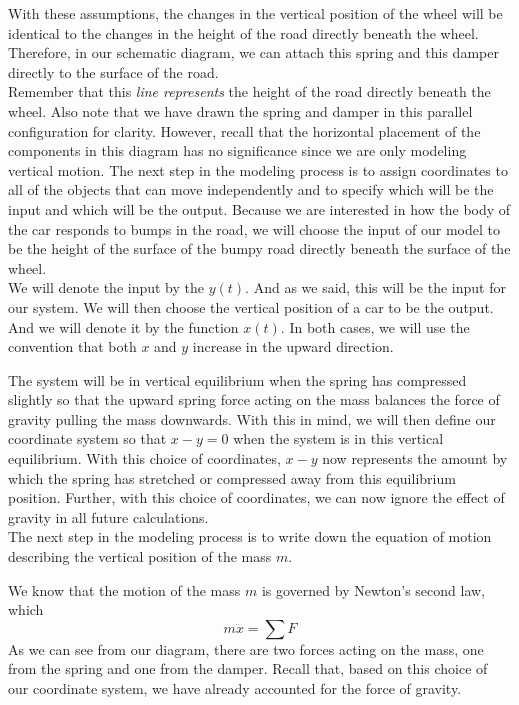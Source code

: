 With these assumptions, the changes in the vertical position of the wheel
will be identical to the changes in the height of the road directly beneath the wheel.
Therefore, in our schematic diagram, we can attach this spring and this damper
directly to the surface of the road.\\

Remember that this \emph{line represents} the height of the road directly beneath the wheel.
Also note that we have drawn the spring and damper
in this parallel configuration for clarity.
However, recall that the horizontal placement of the components in this diagram
has no significance since we are only modeling vertical motion.
The next step in the modeling process is to assign coordinates to all of the objects that
can move independently and to specify which will be the input
and which will be the output.
Because we are interested in how the body of the car responds to bumps in the road,
we will choose the input of our model to be the height of the surface of the bumpy road
directly beneath the surface of the wheel.\\

We will denote the input by the $y(t)$.
And as we said, this will be the input for our system. 
We will then choose the vertical position
of a car to be the output.
And we will denote it by the function $x(t)$.
In both cases, we will use the convention
that both $x$ and $y$ increase in the upward direction.

The system will be in vertical equilibrium
when the spring has compressed slightly
so that the upward spring force acting on the mass
balances the force of gravity pulling the mass downwards.
With this in mind, we will then define our coordinate system
so that $x - y = 0$ when the system is in this vertical equilibrium.
With this choice of coordinates, $x - y$ now represents the amount by which
the spring has stretched or compressed away from this equilibrium position.
Further, with this choice of coordinates, we can now ignore the effect of gravity
in all future calculations. \\


The next step in the modeling process
is to write down the equation of motion describing the vertical position of the mass $m$.

We know that the motion of the mass $m$
is governed by Newton's second law, which
\begin{equation*}
  m \ddot x = \sum F
\end{equation*}
As we can see from our diagram, there
are two forces acting on the mass, one from the spring
and one from the damper.
Recall that, based on this choice
of our coordinate system, we have already accounted
for the force of gravity.\\

